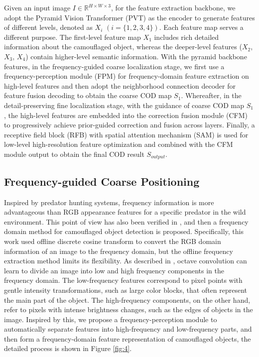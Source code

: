 \documentclass[sigconf,screen]{acmart}
\begin{document}
Given an input image \(I\in \mathbb{R}^{H\times W\times 3}\), for the feature extraction backbone, we adopt the Pyramid Vision Transformer (PVT) \cite{r19} as the encoder to generate features of different levels, denoted as $X_i$ $(i= \{1,2,3,4\})$.
Each feature map serves a different purpose. The first-level feature map $X_1$ includes rich detailed information about the camouflaged object, whereas the deeper-level features (\(X_2\), \(X_3\), \(X_4\)) contain higher-level semantic information. 
With the pyramid backbone features, in the frequency-guided coarse localization stage, we first use a frequency-perception module (FPM) for frequency-domain feature extraction on high-level features and then adopt the neighborhood connection decoder for feature fusion decoding to obtain the coarse COD map $S_1$.
Whereafter, in the detail-preserving fine localization stage, with the guidance of coarse COD map $S_1$, the high-level features are embedded into the correction fusion module (CFM) to progressively achieve prior-guided correction and fusion across layers. 
Finally, a receptive field block (RFB) with spatial attention mechanism (SAM) is used for low-level high-resolution feature optimization and combined with the CFM module output to obtain the final COD result $S_{output}$.



\subsection{Frequency-guided Coarse Positioning}


Inspired by predator hunting systems, frequency information is more advantageous than RGB appearance features for a specific predator in the wild environment. 
This point of view has also been verified in \cite{r39}, and then a frequency domain method for camouflaged object detection is proposed.
Specifically, this work \cite{r39} used offline discrete cosine transform to convert the RGB domain information of an image to the frequency domain, but the offline frequency extraction method limits its flexibility.
As described in \cite{r40}, octave convolution can learn to divide an image into low and high frequency components in the frequency domain. 
The low-frequency features correspond to pixel points with gentle intensity transformations, such as large color blocks, that often represent the main part of the object. The high-frequency components, on the other hand, refer to pixels with intense brightness changes, such as the edges of objects in the image.
Inspired by this, we propose a frequency-perception module to automatically separate features into high-frequency and low-frequency parts, and then form a frequency-domain feature representation of camouflaged objects, the detailed process is shown in Figure \ref{fig:4}. 
\end{document}
